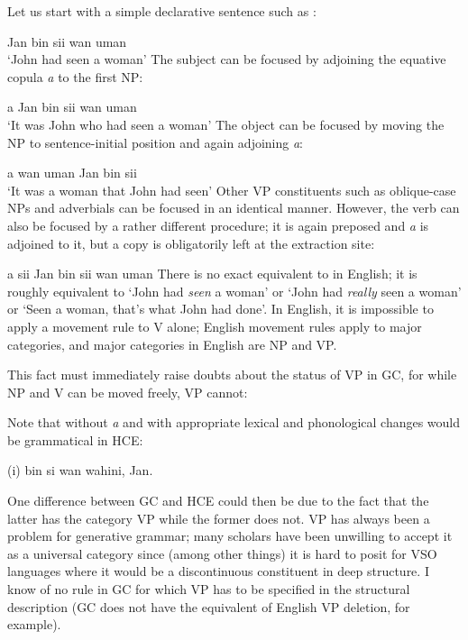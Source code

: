 Let us start with a simple declarative sentence such as :

\ea\label{ex:2:1}
 Jan bin sii wan uman \\
\glt `John had seen a woman'
\z %
The subject can be focused by adjoining the equative copula \textit{a} to the first NP:

\ea\label{ex:2:2}
 a Jan bin sii wan uman\\
\glt `It was John who had seen a woman'
\z
The object can be focused by moving the NP to sentence-initial position and again adjoining \textit{a}:

\ea\label{ex:2:3}
 a wan uman Jan bin sii \\
\glt `It was a woman that John had seen'
\z
Other VP constituents such as oblique-case NPs and adverbials can be focused in an identical manner. However, the verb can also be focused by a rather different procedure; it is again preposed and \textit{a} is adjoined to it, but a copy is obligatorily left at the extraction site:

\ea\label{ex:2:4}
 a sii Jan bin sii wan uman
\z
There is no exact equivalent to  in English; it is roughly equivalent to `John had \textit{seen} a woman' or `John had \textit{really} seen a woman' or `Seen a woman, that's what John had done'. In English, it is impossible to apply a movement rule to V alone; English movement rules apply to major categories, and major categories in English are NP and VP.

This fact must immediately raise doubts about the status of
VP in GC, for while NP and V can be moved freely, VP cannot:

\label{ex:2:5}\z

\label{ex:2:6}\z

\label{ex:2:7}\z

\label{ex:2:8}\z
Note that  without \textit{a} and with appropriate lexical and phonological changes would be grammatical in HCE:

\ea\label{ex:2:9}
(i) bin si wan wahini, Jan.
\z

One difference between GC and HCE could then be due to the fact that the latter has the category VP while the former does not. VP has always been a problem for generative grammar; many scholars have been unwilling to accept it as a universal category since (among other things) it is hard to posit for VSO languages where it would be a discontinuous constituent in deep structure. I know of no rule in GC for which VP has to be specified in the structural description (GC does not have the equivalent of English VP deletion, for example).

